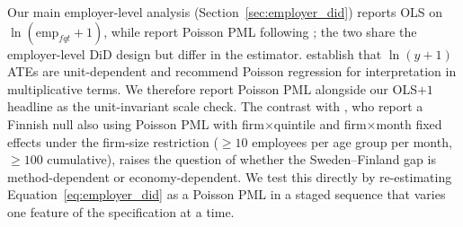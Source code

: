 \documentclass[preprint,12pt,authoryear]{elsarticle}
\begin{document}
Our main employer-level analysis (Section~\ref{sec:employer_did}) reports OLS on $\ln(\text{emp}_{fqt}+1)$, while \citet{brynjolfsson2025canaries} report Poisson PML following \citet{chen2024logs}; the two share the employer-level DiD design but differ in the estimator. \citet{chen2024logs} establish that $\ln(y+1)$ ATEs are unit-dependent and recommend Poisson regression for interpretation in multiplicative terms. We therefore report Poisson PML alongside our OLS$+1$ headline as the unit-invariant scale check. The contrast with \citet{kauhanen2026youth}, who report a Finnish null also using Poisson PML with firm$\times$quintile and firm$\times$month fixed effects under the \citet{brynjolfsson2025canaries} firm-size restriction ($\geq 10$ employees per age group per month, $\geq 100$ cumulative), raises the question of whether the Sweden--Finland gap is method-dependent or economy-dependent. We test this directly by re-estimating Equation~\ref{eq:employer_did} as a Poisson PML in a staged sequence that varies one feature of the specification at a time.
\end{document}
